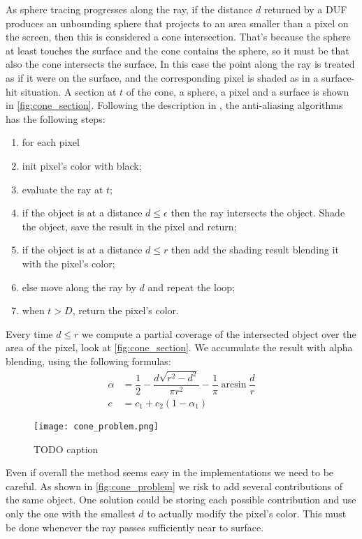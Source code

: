 As sphere tracing progresses along the ray, if the distance $d$ returned by a DUF produces an unbounding sphere that projects to an area smaller than a pixel on the screen, then this is considered a cone intersection.
That's because the sphere at least touches the surface and the cone contains the sphere, so it must be that also the cone intersects the surface.
In this case the point along the ray is treated as if it were on the surface, and the corresponding pixel is shaded as in a surface-hit situation.
A section at $t$ of the cone, a sphere, a pixel and a surface is shown in \autoref{fig:cone_section}.
Following the description in \cite{scratch_sdf}, the anti-aliasing algorithms has the following steps:
\begin{enumerate}
  \item for each pixel
  \item init pixel's color with black;
  \item evaluate the ray at $t$;
  \item if the object is at a distance $d \leq \epsilon$ then the ray intersects the object.
    Shade the object, save the result in the pixel and return;
  \item if the object is at a distance $d \leq r$ then add the shading result blending it with the pixel's color;
  \item else move along the ray by $d$ and repeat the loop;
  \item when $t > D$, return the pixel's color.
\end{enumerate}
Every time $d \leq r$ we compute a partial coverage of the intersected object over the area of the pixel, look at \autoref{fig:cone_section}.
We accumulate the result with alpha blending, using the following formulas:
\begin{align*}
  \alpha &= \dfrac {1}{2} - \dfrac {d \sqrt{r^2 - d^2}} {\pi r^2} - \dfrac{1}{\pi}\arcsin \dfrac {d}{r}\\
  c &= c_1 + c_2 (1 - \alpha_1)
\end{align*}
\begin{figure}[!htb]
  \centering
  \texttt{[image: cone\_problem.png]}
  \caption{TODO caption}
  \label{fig:cone_problem}
\end{figure}
Even if overall the method seems easy in the implementations we need to be careful.
As shown in \autoref{fig:cone_problem} we risk to add several contributions of the same object.
One solution could be storing each possible contribution and use only the one with the smallest $d$ to actually modify the pixel's color.
This must be done whenever the ray passes sufficiently near to surface.

